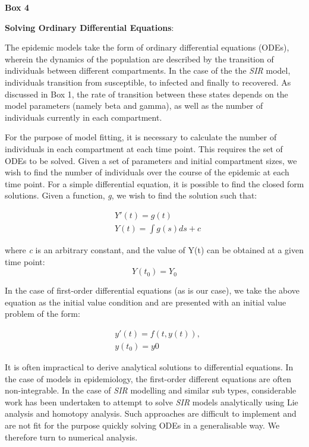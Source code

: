 \documentclass[11pt, a4paper, oneside,titlepage]{article}
\begin{document}
\begin{framed}
{\begin{center}{\bf Box 4}\end{center}}
{\bf Solving Ordinary Differential Equations}:

The epidemic models take the form of ordinary differential
equations (ODEs), wherein the dynamics of the population are described by the
transition of individuals between different compartments. In the case
of the the \emph{SIR} model, individuals transition from susceptible,
to infected and finally to recovered. As discussed in Box 1, the rate
of transition between these states depends on the model parameters
(namely beta and gamma), as well as the number of individuals
currently in each compartment. 

For the purpose of model fitting, it is necessary to calculate the
number of individuals in each compartment at each time point. This
requires the set of ODEs to be solved. Given a set of parameters and
initial compartment sizes, we wish to find the number of individuals
over the course of the epidemic at each time point. For a simple
differential equation, it is possible to find the closed form
solutions. Given a function, \emph{g}, we wish to find the solution
such that:

\begin{equation}
\begin{split}
  &Y'(t) = g(t)\\
  &Y(t) = \int g(s)ds+c
\end{split}
\end{equation}

where \emph{c} is an arbitrary constant, and the value of Y(t) can be
obtained at a given time point: \begin{equation} Y(t_0) = Y_0 \end{equation}

In the case of
first-order differential equations (as is our case), we take the above
equation as the initial value condition and are presented
with an initial value problem of the form:\cite{atkinson} 

\begin{equation}
\begin{split}
  &y'(t) = f(t,y(t)),\\
  &y(t_0) = y0
 \end{split}
 \end{equation}

It is often impractical to derive analytical solutions to
differential equations. In the case of models in epidemiology, the
first-order different equations are often
non-integrable.\cite{shabbir} In the case of \emph{SIR} modelling and similar sub
types, considerable work has been undertaken to attempt to solve
\emph{SIR} models analytically using Lie analysis and homotopy
analysis.\cite{nucci, khan} Such approaches are difficult to implement
and are not fit for the purpose quickly solving ODEs in a
generalisable way. We therefore turn to numerical
analysis.


\end{framed}
\end{document}
